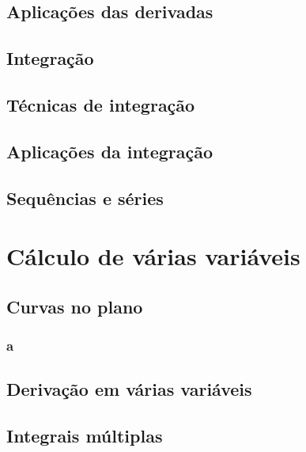 \documentclass[12pt]{book}
\begin{document}
\chapter{Aplicações das derivadas}

\chapter{Integração}

\chapter{Técnicas de integração}

\chapter{Aplicações da integração}

\chapter{Sequências e séries} 


\part{Cálculo de várias variáveis}

\chapter{Curvas no plano}
\section {a}


 

\chapter{Derivação em várias variáveis}

\chapter{Integrais múltiplas}
\end{document}
